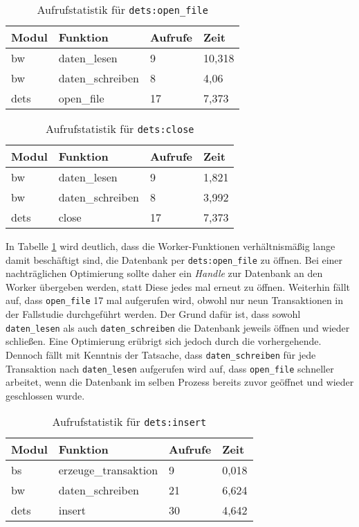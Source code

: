 \begin{table}[H]
	\centering
	\caption{Aufrufstatistik für \texttt{dets:open\_file}}
	\label{tab:prof_open_file}
	\begin{tabular}{p{1.2cm}|p{5cm}|p{2cm}|p{2cm}}
		Modul & Funktion & Aufrufe & Zeit \\
		\hline
		\hline
		bw & daten\_lesen & 9 & 10,318 \\
		bw & daten\_schreiben & 8 & 4,06 \\
		\hline
		dets & open\_file & 17 & 7,373
	\end{tabular}
\end{table}

\begin{table}[H]
	\centering
	\caption{Aufrufstatistik für \texttt{dets:close}}
	\label{tab:prof_close}
	\begin{tabular}{p{1.2cm}|p{5cm}|p{2cm}|p{2cm}}
		Modul & Funktion & Aufrufe & Zeit \\
		\hline
		\hline
		bw & daten\_lesen & 9 & 1,821 \\
		bw & daten\_schreiben & 8 & 3,992 \\
		\hline
		dets & close & 17 & 7,373
	\end{tabular}
\end{table}

In Tabelle \ref{tab:prof_open_file} wird deutlich, dass die Worker-Funktionen verhältnismäßig lange damit beschäftigt sind, die Datenbank per \texttt{dets:open\_file} zu öffnen. Bei einer nachträglichen Optimierung sollte daher ein \textit{Handle} zur Datenbank an den Worker übergeben werden, statt Diese jedes mal erneut zu öffnen. Weiterhin fällt auf, dass \texttt{open\_file} 17 mal aufgerufen wird, obwohl nur neun Transaktionen in der Fallstudie durchgeführt werden. Der Grund dafür ist, dass sowohl \texttt{daten\_lesen} als auch \texttt{daten\_schreiben} die Datenbank jeweils öffnen und wieder schließen. Eine Optimierung erübrigt sich jedoch durch die vorhergehende. Dennoch fällt mit Kenntnis der Tatsache, dass \texttt{daten\_schreiben} für jede Transaktion nach \texttt{daten\_lesen} aufgerufen wird auf, dass \texttt{open\_file} schneller arbeitet, wenn die Datenbank im selben Prozess bereits zuvor geöffnet und wieder geschlossen wurde.

\begin{table}[H]
	\centering
	\caption{Aufrufstatistik für \texttt{dets:insert}}
	\label{tab:prof_dets_insert}
	\begin{tabular}{p{1.2cm}|p{5cm}|p{2cm}|p{2cm}}
		Modul & Funktion & Aufrufe & Zeit \\
		\hline
		\hline
		bs & erzeuge\_transaktion & 9 & 0,018 \\
		bw & daten\_schreiben & 21 & 6,624 \\
		\hline
		dets & insert & 30 & 4,642
	\end{tabular}
\end{table}

